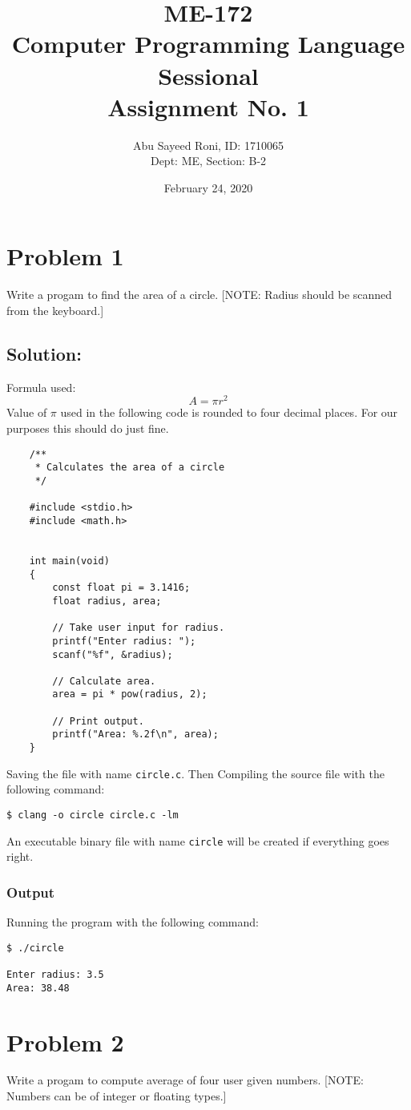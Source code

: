 \documentclass[12pt, letterpaper]{report}
\title{ME-172\\Computer Programming Language Sessional\\Assignment No. 1}
\author{Abu Sayeed Roni, ID: 1710065\\Dept: ME, Section: B-2}
\date{February 24, 2020}
\begin{document}
\maketitle

\section*{Problem 1}
{\large Write a progam to find the area of a circle. [NOTE: Radius should be scanned from the keyboard.]}

\subsection*{Solution:}
Formula used: 
\begin{displaymath}
A = \pi r^2
\end{displaymath}
Value of $\pi$ used in the following code is rounded to four decimal places. For our purposes this should do just fine.
\begin{verbatim}
    /**
     * Calculates the area of a circle
     */

    #include <stdio.h>
    #include <math.h>


    int main(void)
    {
        const float pi = 3.1416;
        float radius, area;

        // Take user input for radius.
        printf("Enter radius: ");
        scanf("%f", &radius);

        // Calculate area.
        area = pi * pow(radius, 2);

        // Print output.
        printf("Area: %.2f\n", area);
    }
\end{verbatim}
Saving the file with name \texttt{circle.c}. Then Compiling the source file with the following command:

\begin{verbatim}
$ clang -o circle circle.c -lm
\end{verbatim}
An executable binary file with name \texttt{circle} will be created if everything goes right.
\subsubsection*{Output}
Running the program with the following command:
\begin{verbatim}
$ ./circle

Enter radius: 3.5
Area: 38.48
\end{verbatim}

\section*{Problem 2}
{\large Write a progam to compute average of four user given numbers. [NOTE: Numbers can be of integer or floating types.]}
\end{document}
